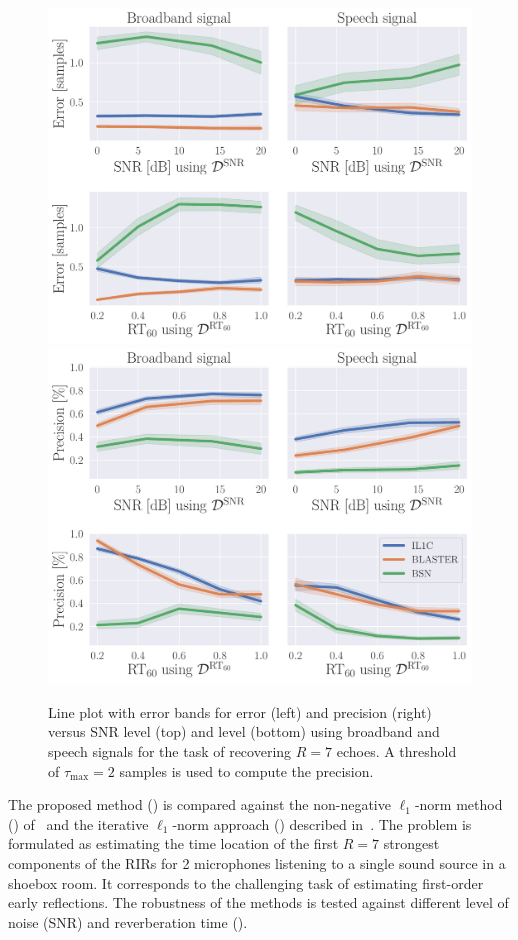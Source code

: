 \begin{figure}[ht]
    \centering
    \includegraphics[width=.49\textwidth]{figures/blaster/e_k-7_thr-2_bns_crocco_blaster.pdf}
    \includegraphics[width=.49\textwidth]{figures/blaster/p_k-7_thr-2_bns_crocco_blaster.pdf}

    \vspace*{2pt}
    \begin{center}
    \caption{%
        \label{fig:error_precision_snr_rt}
        Line plot with error bands for error (left) and precision (right) versus SNR level (top) and \RT{} level (bottom) using broadband and speech signals for the task of recovering $R=7$ echoes. A threshold of $\tau_{\textrm{max}}=2$ samples is used to compute the precision.
    }
    \end{center}
\vspace{-3mm}
\end{figure}

The proposed method (\algoBraire) is compared against the non-negative $\ell_1$-norm method (\algoBsn) of~\cite{Lin2007} and the iterative $\ell_1$-norm approach (\algoCrocco) described in~\cite{Crocco2016}.
The problem is formulated as estimating the time location of the first $R=7$ strongest components of the RIRs for 2 microphones listening to a single sound source in a shoebox room. It corresponds to the challenging task of estimating
first-order early reflections.
The robustness of the methods is tested against different level of noise (SNR) and reverberation time (\RT{}).

